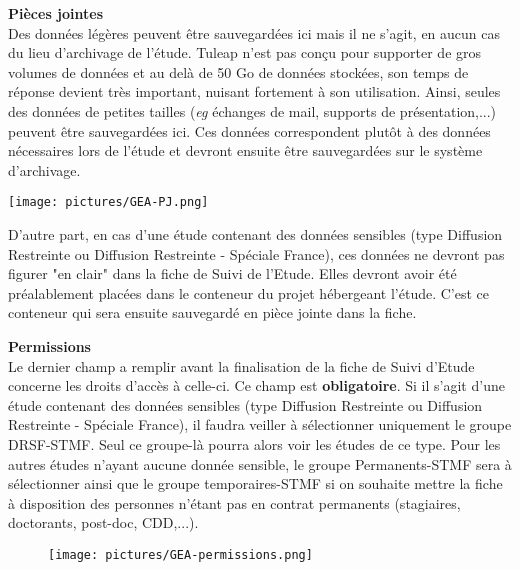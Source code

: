 \begin{minipage}[c]{0.45\linewidth}
\textbf{Pièces jointes}\\
Des données légères peuvent être sauvegardées ici mais il ne s'agit, en aucun cas du lieu d'archivage de l'étude. Tuleap n'est pas conçu pour supporter de gros volumes de données et au delà de 50 Go de données stockées, son temps de réponse devient très important, nuisant fortement à son utilisation. Ainsi, seules des données de petites tailles (\textit{eg} échanges de mail, supports de présentation,...) peuvent être sauvegardées ici. Ces données correspondent plutôt à des données nécessaires lors de l'étude et devront ensuite être sauvegardées sur le système d'archivage.\\
\end{minipage} \hfill
\begin{minipage}[c]{0.5\linewidth}
   \texttt{[image: pictures/GEA-PJ.png]}\vspace*{0.2cm}

\end{minipage}

D'autre part, en cas d'une étude contenant des données sensibles (type Diffusion Restreinte ou Diffusion Restreinte - Spéciale France), ces données ne devront pas figurer "en clair" dans la fiche de Suivi de l'Etude. Elles devront avoir été préalablement placées dans le conteneur du projet hébergeant l'étude. C'est ce conteneur qui sera ensuite sauvegardé en pièce jointe dans la fiche.

\vspace{0.5cm}

\begin{minipage}[c]{0.45\linewidth}
\textbf{Permissions}\\
Le dernier champ a remplir avant la finalisation de la fiche de Suivi d'Etude concerne les droits d'accès à celle-ci. Ce champ est \textbf{obligatoire}. Si il s'agit d'une étude contenant des données sensibles (type Diffusion Restreinte ou Diffusion Restreinte - Spéciale France), il faudra veiller à sélectionner uniquement le groupe DRSF-STMF. Seul ce groupe-là pourra alors voir les études de ce type. Pour les autres études n'ayant aucune donnée sensible, le groupe Permanents-STMF sera à sélectionner ainsi que le groupe temporaires-STMF si on souhaite mettre la fiche à disposition des personnes n'étant pas en contrat permanents (stagiaires, doctorants, post-doc, CDD,...). \\
\end{minipage} \hfill
\begin{minipage}[c]{0.5\linewidth}
   \begin{figure}[H]
      \centering
      \texttt{[image: pictures/GEA-permissions.png]}
      \vspace*{0.2cm}
   \end{figure}
\end{minipage}

